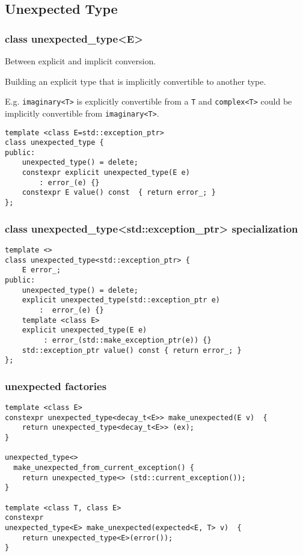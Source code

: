 \documentclass[xcolor=dvipsnames]{beamer}
\newcommand{\cpp}[1]{\lstinline{#1}}
\begin{document}
\subsection{Unexpected Type}
\begin{frame}[fragile]
\frametitle{class unexpected\_type<E>}

Between explicit and implicit conversion.

Building an explicit type that is implicitly convertible to another type.

E.g. \cpp{imaginary<T>} is explicitly convertible from a \cpp{T} and \cpp{complex<T>} could be implicitly convertible from \cpp{imaginary<T>}. 

\begin{lstlisting}
template <class E=std::exception_ptr>
class unexpected_type {
public:
    unexpected_type() = delete;
    constexpr explicit unexpected_type(E e) 
        : error_(e) {}   
    constexpr E value() const  { return error_; }                              
}; 
\end{lstlisting}

\end{frame}
\begin{frame}[fragile]
\frametitle{class unexpected\_type<std::exception\_ptr> specialization}

\begin{lstlisting}
template <>
class unexpected_type<std::exception_ptr> {
    E error_;
public:
    unexpected_type() = delete;
    explicit unexpected_type(std::exception_ptr e) 
        :  error_(e) {}
    template <class E>
    explicit unexpected_type(E e) 
         : error_(std::make_exception_ptr(e)) {}     
    std::exception_ptr value() const { return error_; }                              
}; 
\end{lstlisting}

\end{frame}
\begin{frame}[fragile]
\frametitle{unexpected factories}

\begin{lstlisting}
template <class E>
constexpr unexpected_type<decay_t<E>> make_unexpected(E v)  {
    return unexpected_type<decay_t<E>> (ex);
}

unexpected_type<> 
  make_unexpected_from_current_exception() {
    return unexpected_type<> (std::current_exception());
}

template <class T, class E>
constexpr 
unexpected_type<E> make_unexpected(expected<E, T> v)  {
    return unexpected_type<E>(error());
}

\end{lstlisting}
\end{frame}
\end{document}
